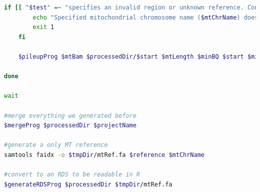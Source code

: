 \begin{lstlisting}[language=bash, caption=Preprocessing of mitochondrial reads and variants for analysis in R, label={lst-cascadeAppendix:mitoPreProcessing}]
    if [[ "$test" =~ "specifies an invalid region or unknown reference. Continue anyway." ]]; then
        echo "Specified mitochondrial chromosome name ($mtChrName) does not exist in bam ($bam)"
        exit 1
    fi

    $pileupProg $mtBam $processedDir/$start $mtLength $minBQ $start $minMQ &

done

wait

#merge everything we generated before
$mergeProg $processedDir $projectName

#generate a only MT reference
samtools faidx -o $tmpDir/mtRef.fa $reference $mtChrName

#convert to an RDS to be readable in R
$generateRDSProg $processedDir $tmpDir/mtRef.fa

\end{lstlisting}


